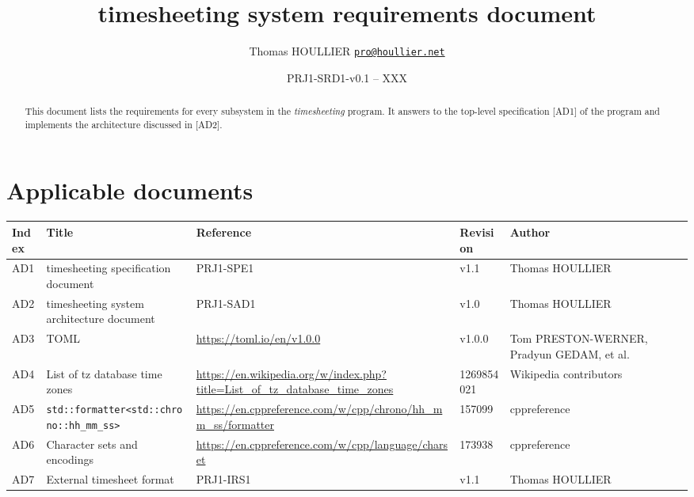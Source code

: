 \documentclass[letterpaper]{article}
\title{timesheeting system requirements document}
\author{Thomas HOULLIER \href{mailto:pro@houllier.net}
         {\texttt{\textlangle pro@houllier.net\textrangle}}}
\begin{document}
\frenchspacing
\date{PRJ1-SRD1-v0.1 -- XXX}
\maketitle
\thispagestyle{FirstPage}

\begin{abstract}
  This document lists the requirements for every subsystem in the
  \emph{timesheeting} program.
  It answers to the top-level specification [AD1] of the program and implements
  the architecture discussed in [AD2].
\end{abstract}

\begin{versionhistory}
\end{versionhistory}
\setcounter{table}{0} %

\section*{Applicable documents}
{ \centering
\begin{tabularx}{\textwidth}{| X | X | X | X | X |} \hline
  Index & Title & Reference & Revision & Author \\ \hline
  AD1   & timesheeting specification document & PRJ1-SPE1 & v1.1 & Thomas
  HOULLIER \\ \hline
  AD2   & timesheeting system architecture document & PRJ1-SAD1 & v1.0 & Thomas
  HOULLIER \\ \hline
  AD3   & TOML & \url{https://toml.io/en/v1.0.0} & v1.0.0 & Tom PRESTON-WERNER,
                                                            Pradyun GEDAM, et
                                                            al. \\ \hline
  AD4   & List of tz database time zones
        & \url{https://en.wikipedia.org/w/index.php?title=List_of_tz_database_time_zones}
                            & 1269854021 & Wikipedia contributors \\ \hline
  AD5   & \lstinline{std::formatter<std::chrono::hh_mm_ss>}
        & \url{https://en.cppreference.com/w/cpp/chrono/hh_mm_ss/formatter}
                            & 157099 & cppreference \\ \hline
  AD6   & Character sets and encodings
        & \url{https://en.cppreference.com/w/cpp/language/charset}
        & 173938 & cppreference \\ \hline
  AD7   & External timesheet format & PRJ1-IRS1 & v1.1 & Thomas HOULLIER \\ \hline
\end{tabularx} \par }
\end{document}
